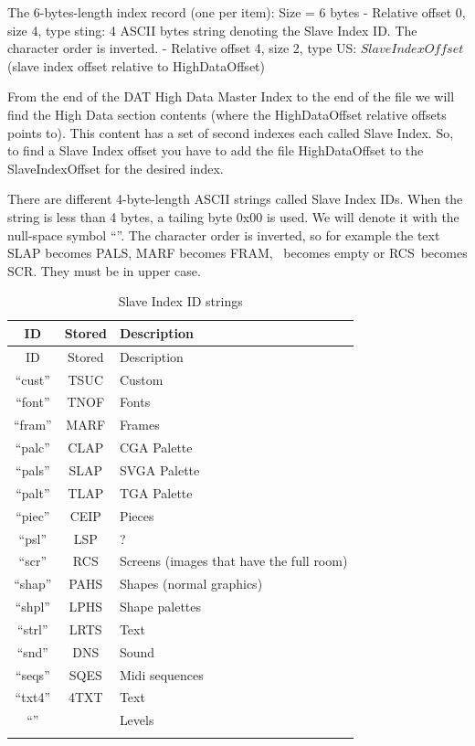\documentclass{article}
\begin{document}
 The 6-bytes-length index record (one per item): Size = 6 bytes
  - Relative offset 0, size 4, type sting: 4 ASCII bytes string denoting
           the Slave Index ID. The character order is inverted.
  - Relative offset 4, size 2, type US: $SlaveIndexOffset$
           (slave index offset relative to HighDataOffset)

 From the end of the  DAT High Data Master Index to the end of the file
 we will find the High Data section contents (where the HighDataOffset
 relative offsets points to). This content has a set of second indexes
 each called Slave Index. So, to find a Slave Index offset you have to
 add the file HighDataOffset to the SlaveIndexOffset for the desired
 index.

 There are different 4-byte-length ASCII strings called Slave Index IDs.
 When the string is less than 4 bytes, a tailing byte 0x00 is used. We will
 denote it with the null-space symbol ``\textvisiblespace''. The character order is inverted, so
 for example the text SLAP becomes PALS, MARF becomes FRAM, \textvisiblespace\textvisiblespace\textvisiblespace\textvisiblespace
 \ becomes empty or RCS\textvisiblespace \ becomes SCR. They must be in upper case.

\renewcommand{\tabcolsep}{0.5em}
\begin{longtable}{ccl}
 \hline
 ID    & Stored& Description \\
 \hline
 \endfirsthead
 \hline
 ID    & Stored& Description \\
 \hline
 \endhead
 ``cust''& TSUC  & Custom  \\
 ``font''& TNOF  & Fonts \\
 ``fram''& MARF  & Frames \\
 ``palc''& CLAP  & CGA Palette \\
 ``pals''& SLAP  & SVGA Palette \index{palette} \\
 ``palt''& TLAP  & TGA Palette \\
 ``piec''& CEIP  & Pieces   \\
 ``psl'' & LSP\textvisiblespace  & ?  \\
 ``scr'' & RCS\textvisiblespace  & Screens (images that have the full room) \\
 ``shap''& PAHS  & Shapes (normal graphics) \\
 ``shpl''& LPHS  & Shape palettes \\
 ``strl''& LRTS  & Text \\
 ``snd'' & DNS\textvisiblespace  & Sound \\
 ``seqs''& SQES  & Midi sequences \\
 ``txt4''& 4TXT  & Text \\
 ``''    & \textvisiblespace\textvisiblespace\textvisiblespace\textvisiblespace  & Levels \\
\hline
\caption{Slave Index ID strings}
\label{slave indexes}
\end{longtable}
\end{document}
